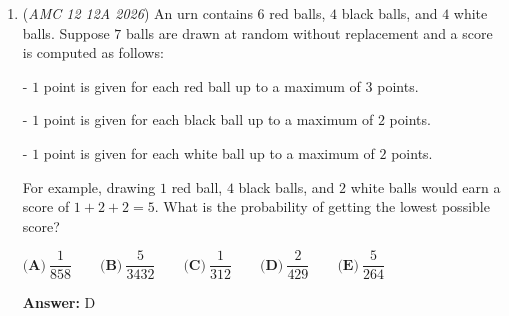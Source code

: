 \begin{enumerate}
 \textbf{Remark} This setup is very similar to the \href{https://en.wikipedia.org/wiki/Calkin\%E2\%80\%93Wilf\_tree}{Calkin-Wilf Tree}, which also contains all rational numbers, but rather than having $\frac{b}{a+b}$, it uses $\frac{a+b}{b}$.

 



\textbf{Solution 7 (Engineer's Induction)}

Looking at the fractions on the far right of the diagram, we can quickly see that the difference in between the numerator and denominator is increasing by $1$. For example, the difference in $\frac{2}{3}$ is $1$, because $3 - 2 = 1$. Likewise, the difference in $\frac{3}{5}$ is 2, and the difference in $\frac{5}{8}$ is 3, because $5 - 3 = 2$ and $8 - 5 = 3$. Let us now use engineer's induction and assume this pattern continues on for this problem. We can also notice that the difference corresponds to the layer/row that the fraction is on by the relationship $n + 1$ (where $n$ is the row). For example, taking the same nodes as before, $\frac{2}{3}$ appears in the second row with a difference of $1$ and therefore $1 + 1 = 2$. Looking at the node $\frac{20}{27}$, we can quickly discern the difference is $7$, and therefore it is on row $7 + 1 = 8$ , making the solution $\boxed{\text{(B) 8}}$



	\item (\textit{AMC 12 12A 2026}) An urn contains $6$ red balls, $4$ black balls, and $4$ white balls. Suppose $7$ balls are drawn at random without replacement and a score is computed as follows:


 - $1$ point is given for each red ball up to a maximum of $3$ points.


 - $1$ point is given for each black ball up to a maximum of $2$ points.


 - $1$ point is given for each white ball up to a maximum of $2$ points.


 For example, drawing $1$ red ball, $4$ black balls, and $2$ white balls would earn a score of $1 + 2 + 2 = 5$. What is the probability of getting the lowest possible score?


 $\textbf{(A)}\   \dfrac{1}{858}  \qquad 	\textbf{(B)}\   \dfrac{5}{3432}  \qquad 	\textbf{(C)}\   \dfrac{1}{312}  \qquad 	\textbf{(D)}\   \dfrac{2}{429}  \qquad 	\textbf{(E)}\   \dfrac{5}{264}$

 \textbf{Answer: }D




\end{enumerate}
